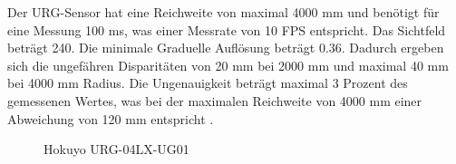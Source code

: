 Der URG-Sensor hat eine Reichweite von maximal 4000 mm und benötigt für eine Messung 100 ms, was einer Messrate von 10 FPS entspricht. Das Sichtfeld beträgt 240\textdegree. Die minimale Graduelle Auflösung beträgt 0.36\textdegree. Dadurch ergeben sich die ungefähren Disparitäten von 20 mm bei 2000 mm und maximal 40 mm bei 4000 mm Radius. Die Ungenauigkeit beträgt maximal 3 Prozent des gemessenen Wertes, was bei der maximalen Reichweite von 4000 mm einer Abweichung von 120 mm entspricht \citep{maeda2009}.

 \begin{figure}[H]
 	\centering
 	\caption{Hokuyo URG-04LX-UG01}
 	\label{fig:aufbau-hok}
 \end{figure}

